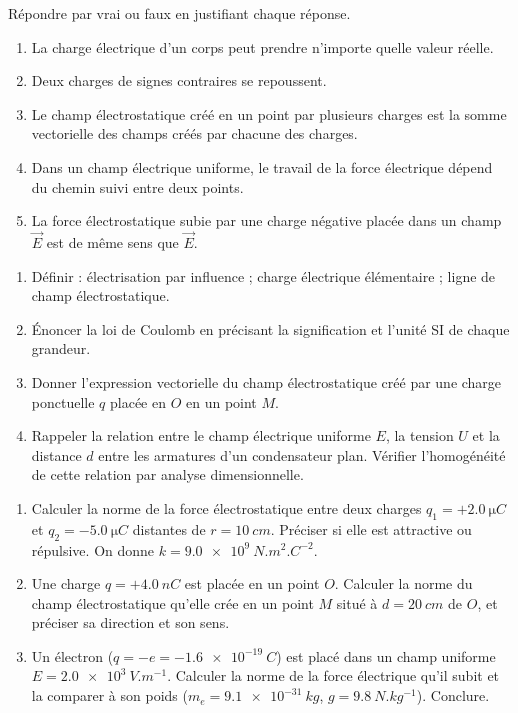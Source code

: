 \documentclass[11pt]{article}
\begin{document}
\begin{exercice}
Répondre par vrai ou faux en justifiant chaque réponse.
\begin{enumerate}
\item La charge électrique d'un corps peut prendre n'importe quelle valeur réelle.
\item Deux charges de signes contraires se repoussent.
\item Le champ électrostatique créé en un point par plusieurs charges est la somme vectorielle des champs créés par chacune des charges.
\item Dans un champ électrique uniforme, le travail de la force électrique dépend du chemin suivi entre deux points.
\item La force électrostatique subie par une charge négative placée dans un champ $\vec{E}$ est de même sens que $\vec{E}$.
\end{enumerate}
\end{exercice}

\begin{exercice}
\begin{enumerate}
\item Définir : électrisation par influence ; charge électrique élémentaire ; ligne de champ électrostatique.
\item Énoncer la loi de Coulomb en précisant la signification et l'unité SI de chaque grandeur.
\item Donner l'expression vectorielle du champ électrostatique créé par une charge ponctuelle $q$ placée en $O$ en un point $M$.
\item Rappeler la relation entre le champ électrique uniforme $E$, la tension $U$ et la distance $d$ entre les armatures d'un condensateur plan. Vérifier l'homogénéité de cette relation par analyse dimensionnelle.
\end{enumerate}
\end{exercice}

\begin{exercice}
\begin{enumerate}
\item Calculer la norme de la force électrostatique entre deux charges $q_1 = +\SI{2,0}{\micro C}$ et $q_2 = -\SI{5,0}{\micro C}$ distantes de $r = \SI{10}{cm}$. Préciser si elle est attractive ou répulsive. On donne $k = \SI{9,0e9}{N.m^2.C^{-2}}$.
\item Une charge $q = +\SI{4,0}{nC}$ est placée en un point $O$. Calculer la norme du champ électrostatique qu'elle crée en un point $M$ situé à $d = \SI{20}{cm}$ de $O$, et préciser sa direction et son sens.
\item Un électron ($q = -e = -\SI{1,6e-19}{C}$) est placé dans un champ uniforme $E = \SI{2,0e3}{V.m^{-1}}$. Calculer la norme de la force électrique qu'il subit et la comparer à son poids ($m_e = \SI{9,1e-31}{kg}$, $g = \SI{9,8}{N.kg^{-1}}$). Conclure.
\end{enumerate}
\end{exercice}
\end{document}

